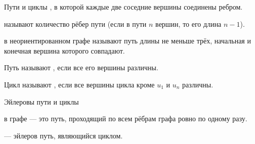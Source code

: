\begin{frame}{Пути и циклы}
, в которой каждые две соседние вершины соединены ребром.

 {} называют количество рёбер пути (если в пути $n$ вершин, то его длина $n-1$).

 {} в неориентированном графе называют путь длины не меньше трёх, начальная и конечная вершина которого совпадают.

 Путь называют , если все его вершины различны.

 Цикл называют , если все вершины цикла кроме $u_1$ и $u_n$ различны.

\end{frame}

\begin{frame}{Эйлеровы пути и циклы}

 в графе --- это путь, проходящий по всем рёбрам графа ровно по одному разу.
\spc

 --- эйлеров путь, являющийся циклом.

\end{frame}

